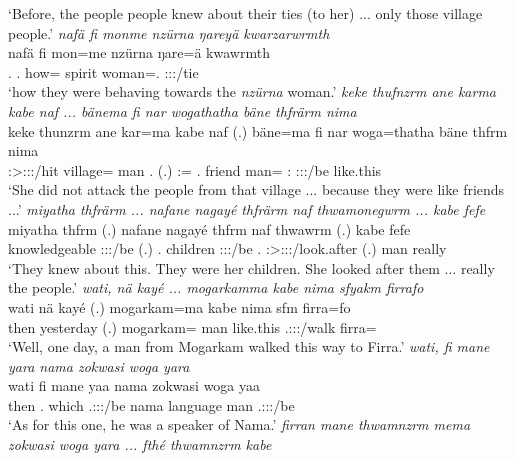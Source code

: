 \begin{exe}
	\trans `Before, the people people knew about their ties (to her) ... only those village people.'
	\emph{nafä fi monme nzürna ŋareyä kwarzarwrmth}\\
	\gll nafä fi mon=me nzürna ŋare=ä kwawrmth\\
	\Tpl.\Assoc{} \Third.\Abs{} how=\Ins{} spirit woman=\Assoc.\Pl{} \Stpl:\Sbj:\Pst:\Dur/tie\\
	\trans `how they were behaving towards the \emph{nzürna} woman.'
	\emph{keke thufnzrm ane karma kabe naf ... bänema fi nar wogathatha bäne thfrärm nima}\\
	\gll keke thunzrm ane kar=ma kabe naf (.) bäne=ma fi nar woga=thatha bäne thfrm nima\\
	\Neg{} \Stsg:\Sbj>\Stpl:\Obj:\Pst:\Dur/hit \Dem{} village=\Char{} man \Tsg.\Erg{} (.) \Dem:\Med=\Char{} \Third.\Abs{} friend man=\Simil{} \Dem:\Med{} \Stpl:\Sbj:\Pst:\Dur/be {like.this}\\
	\trans `She did not attack the people from that village ... because they were like friends ...'
	\emph{miyatha thfrärm ... nafane nagayé thfrärm naf thwamonegwrm ... kabe fefe}\\
	\gll miyatha thfrm (.) nafane nagayé thfrm naf thwawrm (.) kabe fefe\\
	knowledgeable \Stpl:\Sbj:\Pst:\Dur/be (.) \Tnsg.\Poss{} children \Stpl:\Sbj:\Pst:\Dur/be \Tsg.\Erg{} \Stsg:\Sbj>\Stpl:\Io:\Pst:\Dur/look.after (.) man really\\
	\trans `They knew about this. They were her children. She looked after them ... really the people.'
	\emph{wati, nä kayé ... mogarkamma kabe nima sfyakm firrafo}\\
	\gll wati nä kayé (.) mogarkam=ma kabe nima sfm firra=fo\\
	then \Indf{} yesterday (.) mogarkam=\Char{} man {like.this} \Tsg.\Masc:\Sbj:\Pst:\Dur/walk firra=\All{}\\
	\trans `Well, one day, a man from Mogarkam walked this way to Firra.'
	\emph{wati, fi mane yara nama zokwasi woga yara}\\
	\gll wati fi mane yaa nama zokwasi woga yaa\\
	then \Third.\Abs{} which \Tsg.\Masc:\Sbj:\Pst:\Ipfv/be nama language man \Tsg.\Masc:\Sbj:\Pst:\Ipfv/be\\
	\trans `As for this one, he was a speaker of Nama.'
	\emph{firran mane thwamnzrm mema zokwasi woga yara ... fthé thwamnzrm kabe}\\

\end{exe}
